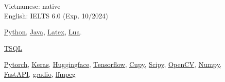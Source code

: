 \documentclass{src/preamble/doc_class}
\begin{document}
	\begin{SideBar}{\ColorBackground}{\ColorTextSide}


      	\begin{minipage}[t][1.25cm]{6cm}
        \vspace{-1.5mm}
        Vietnamese: native\\
        English: IELTS 6.0 (Exp. 10/2024)
        \end{minipage}

		\begin{minipage}[t][0.75cm]{6cm}
        \vspace{-1.5mm}
        \href{https://www.python.org/}{Python}, \href{https://www.java.com/en/}{Java}, \href{https://www.tug.org/texlive/}{Latex}, \href{https://www.lua.org/}{Lua}.
        \end{minipage}

        \begin{minipage}[t][0.75cm]{6cm}
        \vspace{-1.5mm}
         \href{https://www.microsoft.com/en-us/sql-server}{TSQL}
        \end{minipage}

        \begin{minipage}[t][1.65cm]{6cm}
        \vspace{-1.5mm}
        \href{https://pytorch.org/}{Pytorch}, \href{https://keras.io/}{Keras}, \href{https://huggingface.co/}{Huggingface}, \href{https://www.tensorflow.org/}{Tensorflow}, \href{https://cupy.dev/}{Cupy}, \href{https://scipy.org/}{Scipy}, \href{https://opencv.org/}{OpenCV},  \href{https://numpy.org/doc/stable/reference/generated/numpy.save.html}{Numpy}, \href{https://fastapi.tiangolo.com/about/}{FastAPI}, \href{https://www.gradio.app/}{gradio}, \href{https://ffmpeg.org/}{ffmpeg}
        \end{minipage}


\end{SideBar}
\end{document}
